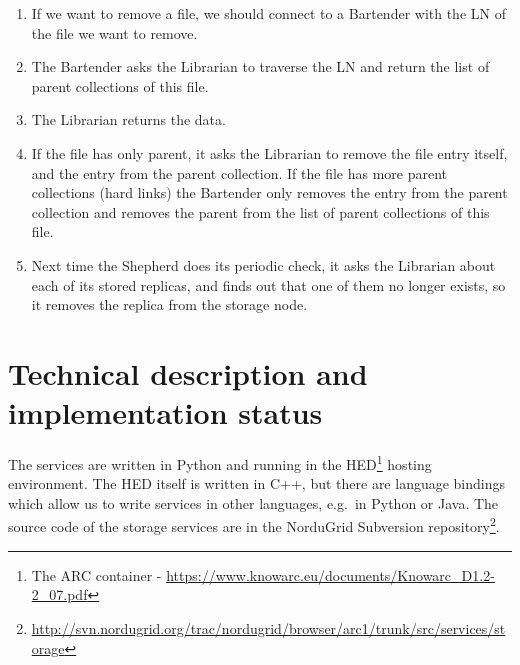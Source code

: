 \documentclass{book}
\begin{document}
\begin{figure}[ht]
\end{figure}
\begin{enumerate}
    \item If we want to remove a file, we should connect to a Bartender with the LN of the file we want to remove.
    \item The Bartender asks the Librarian to traverse the LN and return the list of parent collections of this file.
    \item The Librarian returns the data.
    \item If the file has only parent, it asks the Librarian to remove the file entry itself, and the entry from the parent collection. If the file has more parent collections (hard links) the Bartender only removes the entry from the parent collection and removes the parent from the list of parent  collections of this file.
    \item Next time the Shepherd does its periodic check, it asks the Librarian about each of its stored replicas, and finds out that one of them no longer exists, so it removes the replica from the storage node.
\end{enumerate}




\chapter{Technical description and implementation status} %
\label{cha:technical_description_and_implementation_status}

The services are written in Python and running in the HED\footnote{The ARC container - \url{https://www.knowarc.eu/documents/Knowarc\_D1.2-2\_07.pdf}} hosting environment. The HED itself is written in C++, but there are language bindings which allow us to write services in other languages, e.g.~in Python or Java. The source code of the storage services are in the NorduGrid Subversion repository\footnote{\url{http://svn.nordugrid.org/trac/nordugrid/browser/arc1/trunk/src/services/storage}}.
\end{document}
